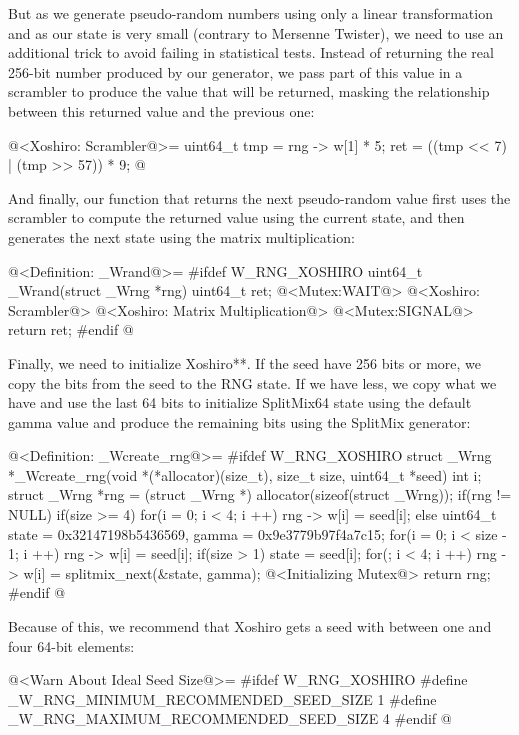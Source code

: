 But as we generate pseudo-random numbers using only a linear
transformation and as our state is very small (contrary to Mersenne
Twister), we need to use an additional trick to avoid failing in
statistical tests. Instead of returning the real 256-bit number
produced by our generator, we pass part of this value in a scrambler
to produce the value that will be returned, masking the relationship
between this returned value and the previous one:

\iniciocodigo
@<Xoshiro: Scrambler@>=
{
  uint64_t tmp = rng -> w[1] * 5;
  ret = ((tmp << 7) | (tmp >> 57)) * 9;
} 
@
\fimcodigo

And finally, our function that returns the next pseudo-random value
first uses the scrambler to compute the returned
value  using the current state, and then generates the
next state using the matrix multiplication:

\iniciocodigo
@<Definition: \_Wrand@>=
#ifdef W_RNG_XOSHIRO
uint64_t _Wrand(struct _Wrng *rng){
  uint64_t ret;
  @<Mutex:WAIT@>
  @<Xoshiro: Scrambler@>
  @<Xoshiro: Matrix Multiplication@>
  @<Mutex:SIGNAL@>
  return ret;
}
#endif
@
\fimcodigo

Finally, we need to initialize Xoshiro**. If the seed have 256 bits or
more, we copy the bits from the seed to the RNG state. If we have
less, we copy what we have and use the last 64 bits to initialize
SplitMix64 state using the default gamma value and produce the
remaining bits using the SplitMix generator:

\iniciocodigo
@<Definition: \_Wcreate\_rng@>=
#ifdef W_RNG_XOSHIRO
struct _Wrng *_Wcreate_rng(void *(*allocator)(size_t), size_t size,
                           uint64_t *seed){
  int i;
  struct _Wrng *rng = (struct _Wrng *) allocator(sizeof(struct _Wrng));
  if(rng != NULL){
    if(size >= 4){
      for(i = 0; i < 4; i ++)
        rng -> w[i] = seed[i];
    }
    else{
      uint64_t state = 0x32147198b5436569, gamma = 0x9e3779b97f4a7c15;
      for(i = 0; i < size - 1; i ++)
        rng -> w[i] = seed[i];
      if(size > 1)
        state = seed[i];
      for(; i < 4; i ++)
        rng -> w[i] = splitmix_next(&state, gamma);
    }                           
    @<Initializing Mutex@>
  }
  return rng;
}
#endif
@
\fimcodigo

Because of this, we recommend that Xoshiro gets a seed with between
one and four 64-bit elements:

\iniciocodigo
@<Warn About Ideal Seed Size@>=
#ifdef W_RNG_XOSHIRO
#define _W_RNG_MINIMUM_RECOMMENDED_SEED_SIZE  1
#define _W_RNG_MAXIMUM_RECOMMENDED_SEED_SIZE  4
#endif
@
\fimcodigo


